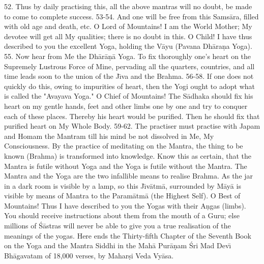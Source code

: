 52. Thus by daily practising this, all the above mantras will no doubt, be made to come to complete success.
53-54. And one will be free from this Sams\=ara, filled with old age and death, etc. O Lord of Mountains! I am the World Mother; My devotee will get all My qualities; there is no doubt in this. O Child! I have thus described to you the excellent Yoga, holding the V\=ayu (Pavana Dh\=ara\d{n}a Yoga).
55. Now hear from Me the Dh\=ar\=a\d{n}\=a Yoga. To fix thoroughly one's heart on the Supremely Lustrous Force of Mine, pervading all the quarters, countries, and all time leads soon to the union of the J\={\i}va and the Brahma.
56-58. If one does not quickly do this, owing to impurities of heart, then the Yogi ought to adopt what is called the "Avayava Yoga." O Chief of Mountains! The S\=adhaka should fix his heart on my gentle hands, feet and other limbs one by one and try to conquer each of these places. Thereby his heart would be purified. Then he should fix that purified heart on My Whole Body.
59-62. The practiser must practise with Japam and Homam the Mantram till his mind be not dissolved in Me, My Consciousness. By the practice of meditating on the Mantra, the thing to be known (Brahma) is transformed into knowledge. Know this as certain, that the Mantra is futile without Yoga and the Yoga is futile without the Mantra. The Mantra and the Yoga are the two infallible means to realise Brahma. As the jar in a dark room is visible by a lamp, so this J\={\i}v\=atm\=a, surrounded by M\=ay\=a is visible by means of Mantra to the Param\=atm\=a (the Highest Self). O Best of Mountains! Thus I have described to you the Yogas with their A\d{n}gas (limbs). You should receive instructions about them from the mouth of a Guru; else millions of \'S\=astras will never be able to give you a true realisation of the meanings of the yogas.
Here ends the Thirty-fifth Chapter of the Seventh Book on the Yoga and the Mantra Siddhi in the Mah\=a Pur\=a\d{n}am \'Sri Mad Dev\={\i} Bh\=agavatam of 18,000 verses, by Mahar\d{s}i Veda Vy\=asa.



